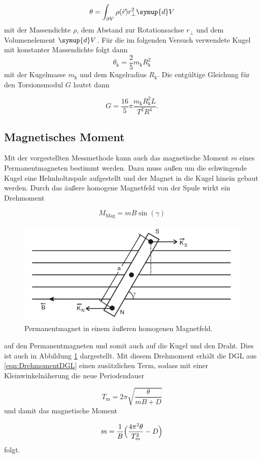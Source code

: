 \begin{equation}
  \theta = \int_{\partial V}^{} \rho(\vec{r}) r_\perp^2 \symup{d}V
\end{equation}
mit der Massendichte $\rho$, dem Abstand zur Rotationsachse $r_\perp$ und dem
Volumenelement $\symup{d}V$.
Für die im folgenden Versuch verwendete Kugel mit konstanter Massendichte
folgt dann
\begin{equation}
  \theta_\text{k} = \frac{2}{5} m_\text{k} R_\text{k}^2
\end{equation}
mit der Kugelmasse $m_\text{k}$ und dem Kugelradius $R_\text{k}$.
Die entgültige Gleichung für den Torsionsmodul $G$ lautet dann

\begin{equation}
  G = \frac{16}{5} \pi \frac{m_\text{k}R_\text{k}^2 L}{T^2 R^4}.
  \label{eqn:schubG}
\end{equation}


\subsection{Magnetisches Moment}

Mit der vorgestellten Messmethode kann auch das magnetische Moment
$m$ eines Permanentmagneten bestimmt werden.
Dazu muss außen um die schwingende Kugel
eine Helmholtzspule aufgestellt und der Magnet in die Kugel hinein gebaut
werden.
Durch das äußere homogene Magnetfeld von der Spule wirkt ein Drehmoment

\begin{equation}
   M_\text{Mag} = mB\sin(\gamma)
\end{equation}

\begin{figure}
  \centering
  \includegraphics[height=5cm]{magnMom.png}
  \caption{Permanentmagnet in einem äußeren homogenen Magnetfeld.
  \cite{anleitung}}
  \label{fig:MagnetMoment}
\end{figure}

auf den Permanentmagneten und somit auch auf die Kugel und den Draht.
Dies ist auch in Abbildung \ref{fig:MagnetMoment} dargestellt.
Mit diesem Drehmoment erhält die DGL aus \eqref{eqn:DrehmomentDGL} einen
zusätzlichen Term, sodass mit einer Kleinwinkelnäherung
die neue Periodendauer

\begin{equation}
  T_\text{m} = 2\pi \sqrt{\frac{\theta}{mB+D}}
  \label{eqn:altmagmom}
\end{equation}
und damit das magnetische Moment

\begin{equation}
  m = \frac{1}{B}\Bigl(\frac{4 \pi^2 \theta}{T_m^2}-D\Bigr)
\end{equation}
folgt.
